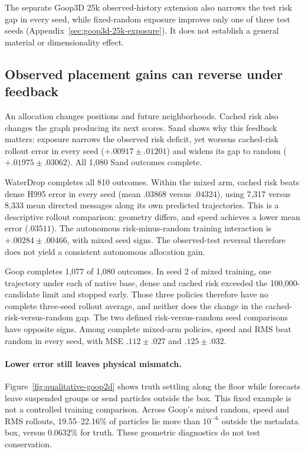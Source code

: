 The separate Goop3D 25k observed-history extension also narrows the test risk gap in every seed, while fixed-random exposure improves only one of three test seeds (Appendix~\ref{sec:goop3d-25k-exposure}). It does not establish a general material or dimensionality effect.



\subsection{Observed placement gains can reverse under feedback}
An allocation changes positions and future neighborhoods. Cached risk also changes the graph producing its next scores. Sand shows why this feedback matters: exposure narrows the observed risk deficit, yet worsens cached-risk rollout error in every seed ($+.00917\pm.01201$) and widens its gap to random ($+.01975\pm.03062$). All 1,080 Sand outcomes complete.

WaterDrop completes all 810 outcomes. Within the mixed arm, cached risk beats dense H995 error in every seed (mean $.03868$ versus $.04324$), using 7,317 versus 8,333 mean directed messages along its own predicted trajectories. This is a descriptive rollout comparison: geometry differs, and speed achieves a lower mean error ($.03511$). The autonomous risk-minus-random training interaction is $+.00284\pm.00466$, with mixed seed signs. The observed-test reversal therefore does not yield a consistent autonomous allocation gain.

Goop completes 1,077 of 1,080 outcomes. In seed 2 of mixed training, one trajectory under each of native base, dense and cached risk exceeded the 100,000-candidate limit and stopped early. Those three policies therefore have no complete three-seed rollout average, and neither does the change in the cached-risk-versus-random gap. The two defined risk-versus-random seed comparisons have opposite signs. Among complete mixed-arm policies, speed and RMS beat random in every seed, with MSE $.112\pm.027$ and $.125\pm.032$.


\paragraph{Lower error still leaves physical mismatch.}
Figure~\ref{fig:qualitative-goop2d} shows truth settling along the floor while forecasts leave suspended groups or send particles outside the box. This fixed example is not a controlled training comparison. Across Goop's mixed random, speed and RMS rollouts, 19.55--22.16\% of particles lie more than $10^{-6}$ outside the metadata box, versus $0.0632\%$ for truth. These geometric diagnostics do not test conservation.

